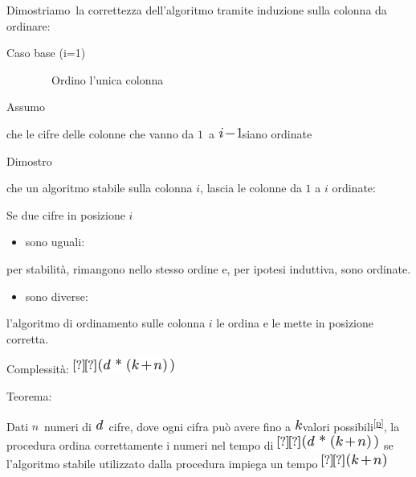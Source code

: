 \documentclass{article}
\providecommand{\tightlist}{%
  \setlength{\itemsep}{0pt}\setlength{\parskip}{0pt}}
\begin{document}
{Dimostriamo}{~la correttezza dell'algoritmo tramite induzione sulla
colonna da ordinare:}

{Caso base (i=1)}

{~~~~~~~~Ordino l'unica colonna}

{Assumo}

{che le cifre delle colonne che vanno da
}$1${~a
}\includegraphics{images/image195.png}{siano ordinate}

{Dimostro }

{che un algoritmo stabile sulla colonna $i$, lascia le colonne da $1$ a $i$ ordinate:}

{Se due cifre in posizione $i$}

\begin{itemize}
\tightlist
\item
  {sono }{uguali}{: }
\end{itemize}

{per stabilità, rimangono nello stesso ordine e, per ipotesi induttiva, sono ordinate.}

\begin{itemize}
\tightlist
\item
  {sono }{diverse}{:}
\end{itemize}

{l'algoritmo di ordinamento sulle colonna $i$ le ordina e le mette in posizione corretta.}

{Complessità: }\includegraphics{images/image196.png}

{Teorema: }

{Dati }$n${~numeri di
}\includegraphics{images/image197.png}{~cifre, }{dove ogni cifra può
avere fino a }\includegraphics{images/image118.png}{valori
possibili}\textsuperscript{\protect\hyperlink{cmnt16}{{[}p{]}}}{, la
procedura ordina correttamente i numeri nel tempo di
}\includegraphics{images/image196.png}{~se l'algoritmo stabile
utilizzato dalla procedura impiega un tempo
}\includegraphics{images/image198.png}
\end{document}
